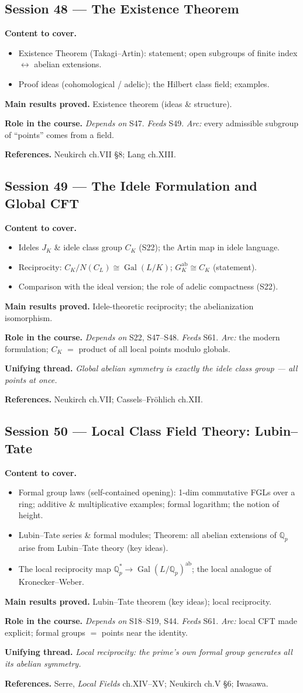 \documentclass[11pt,a4paper]{article}
\newcommand{\sess}[2]{\subsection[#1. #2]{Session #1 --- #2}}
\newcommand{\chead}{\par\smallskip\noindent\textbf{Content to cover.}}
\newcommand{\proved}[1]{\par\smallskip\noindent\textbf{Main results proved.} #1}
\newcommand{\role}[1]{\par\smallskip\noindent\textbf{Role in the course.} #1}
\newcommand{\thread}[1]{\par\smallskip\noindent\textbf{Unifying thread.} \textit{#1}}
\newcommand{\srefs}[1]{\par\smallskip\noindent\textbf{References.} #1}
\newcommand{\Q}{\mathbb{Q}}
\newcommand{\Gal}{\operatorname{Gal}}
\begin{document}
	\sess{48}{The Existence Theorem}
	\chead
	\begin{itemize}
		\item Existence Theorem (Takagi--Artin): statement; open subgroups of finite index $\leftrightarrow$ abelian extensions.
		\item Proof ideas (cohomological / adelic); the Hilbert class field; examples.
	\end{itemize}
	\proved{Existence theorem (ideas \& structure).}
	\role{\emph{Depends on} S47. \emph{Feeds} S49. \emph{Arc:} every admissible subgroup of ``points'' comes from a field.}
	\srefs{Neukirch ch.VII \S8; Lang ch.XIII.}
	
	\sess{49}{The Idele Formulation and Global CFT}
	\chead
	\begin{itemize}
		\item Ideles $J_K$ \& idele class group $C_K$ (S22); the Artin map in idele language.
		\item Reciprocity: $C_K/N(C_L)\cong\Gal(L/K)$; $G_K^{\mathrm{ab}}\cong C_K$ (statement).
		\item Comparison with the ideal version; the role of adelic compactness (S22).
	\end{itemize}
	\proved{Idele-theoretic reciprocity; the abelianization isomorphism.}
	\role{\emph{Depends on} S22, S47--S48. \emph{Feeds} S61. \emph{Arc:} the modern formulation; $C_K$ $=$ product of all local points modulo globals.}
	\thread{Global abelian symmetry is exactly the idele class group --- all points at once.}
	\srefs{Neukirch ch.VII; Cassels--Fr\"ohlich ch.XII.}
	
	\sess{50}{Local Class Field Theory: Lubin--Tate}
	\chead
	\begin{itemize}
		\item Formal group laws (self-contained opening): 1-dim commutative FGLs over a ring; additive \& multiplicative examples; formal logarithm; the notion of height.
		\item Lubin--Tate series \& formal modules; Theorem: all abelian extensions of $\Q_p$ arise from Lubin--Tate theory (key ideas).
		\item The local reciprocity map $\Q_p^*\to\Gal(L/\Q_p)^{\mathrm{ab}}$; the local analogue of Kronecker--Weber.
	\end{itemize}
	\proved{Lubin--Tate theorem (key ideas); local reciprocity.}
	\role{\emph{Depends on} S18--S19, S44. \emph{Feeds} S61. \emph{Arc:} local CFT made explicit; formal groups $=$ points near the identity.}
	\thread{Local reciprocity: the prime's own formal group generates all its abelian symmetry.}
	\srefs{Serre, \emph{Local Fields} ch.XIV--XV; Neukirch ch.V \S6; Iwasawa.}
	
\end{document}
